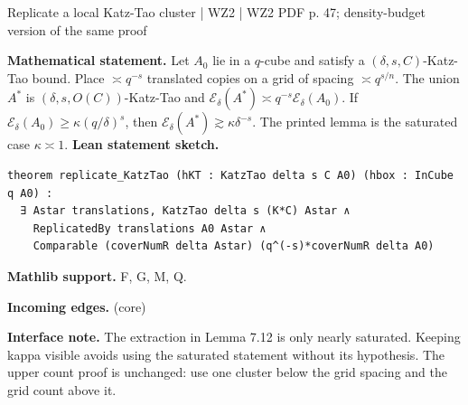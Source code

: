 \documentclass[10pt,a4paper]{article}
\newcommand{\nodecard}[1]{\hyperlink{node-#1}{\texttt{\detokenize{#1}}}}
\begin{document}
\begin{minipage}{\linewidth}
\hypertarget{node-W2L7_11}{}
\begin{tcolorbox}[colback=white,colframe=cinematicfg,colbacktitle=cinematicbg,coltitle=ink,boxrule=0.45pt,arc=1.6mm,left=3mm,right=3mm,top=2mm,bottom=2mm,title={\sffamily\bfseries WZ2 Lemma 7.11 \hfill \texttt{W2L7\_11}}]
{\sffamily\small\color{muted}Replicate a local Katz-Tao cluster | WZ2 | WZ2 PDF p. 47; density-budget version of the same proof}\par
\textbf{Mathematical statement.} Let $A_0$ lie in a $q$-cube and satisfy a $(\delta,s,C)$-Katz-Tao bound.
Place $\asymp q^{-s}$ translated copies on a grid of spacing $\asymp q^{s/n}$.
The union $A^*$ is $(\delta,s,O(C))$-Katz-Tao and
$\mathcal E_\delta(A^*)\asymp q^{-s}\mathcal E_\delta(A_0)$.
If $\mathcal E_\delta(A_0)\ge\kappa(q/\delta)^s$, then $\mathcal E_\delta(A^*)\gtrsim\kappa\delta^{-s}$.
The printed lemma is the saturated case $\kappa\asymp1$.
\smallskip\textbf{Lean statement sketch.}
\begin{Verbatim}[fontsize=\small,breaklines=true,breakanywhere=true,tabsize=2]
theorem replicate_KatzTao (hKT : KatzTao delta s C A0) (hbox : InCube q A0) :
  ∃ Astar translations, KatzTao delta s (K*C) Astar ∧
    ReplicatedBy translations A0 Astar ∧
    Comparable (coverNumR delta Astar) (q^(-s)*coverNumR delta A0)
\end{Verbatim}
{\footnotesize\textbf{Mathlib support.} F, G, M, Q.\par
\textbf{Incoming edges.} \nodecard{W2DKT} (core)\par}
{\footnotesize\textbf{Interface note.} The extraction in Lemma 7.12 is only nearly saturated. Keeping kappa visible avoids using the saturated statement without its hypothesis. The upper count proof is unchanged: use one cluster below the grid spacing and the grid count above it.}
\end{tcolorbox}\end{minipage}\par\medskip
\end{document}
